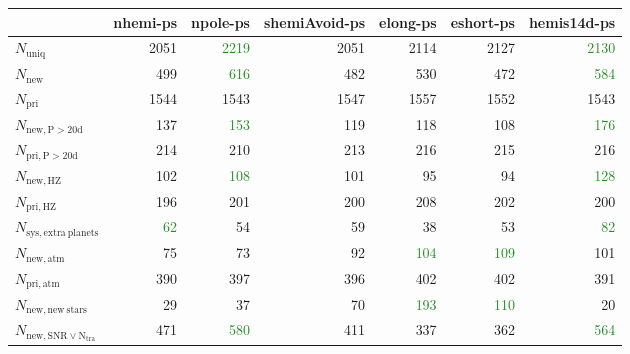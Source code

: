 \begin{tabular}{lrrrrrr}
\toprule
{} &  nhemi-ps &  npole-ps &  shemiAvoid-ps &  elong-ps &  eshort-ps &  hemis14d-ps \\
\midrule
$N_{\mathrm{uniq}}$                &      2051 &      \textcolor{ForestGreen}{2219} &           2051 &      2114 &       2127 &         \textcolor{ForestGreen}{2130} \\
$N_{\mathrm{new}}$                 &       499 &       \textcolor{ForestGreen}{616} &            482 &       530 &        472 &          \textcolor{ForestGreen}{584} \\
$N_{\mathrm{pri}}$                 &      1544 &      1543 &           1547 &      1557 &       1552 &         1543 \\
$N_{\mathrm{new,P>20d}}$           &       137 &       \textcolor{ForestGreen}{153} &            119 &       118 &        108 &          \textcolor{ForestGreen}{176} \\
$N_{\mathrm{pri,P>20d}}$           &       214 &       210 &            213 &       216 &        215 &          216 \\
$N_{\mathrm{new,HZ}}$              &       102 &       \textcolor{ForestGreen}{108} &            101 &        95 &         94 &          \textcolor{ForestGreen}{128} \\
$N_{\mathrm{pri,HZ}}$              &       196 &       201 &            200 &       208 &        202 &          200 \\
$N_{\mathrm{sys,extra\ planets}}$  &        \textcolor{ForestGreen}{62} &        54 &             59 &        38 &         53 &           \textcolor{ForestGreen}{82} \\
$N_{\mathrm{new,atm}}$             &        75 &        73 &             92 &       \textcolor{ForestGreen}{104} &        \textcolor{ForestGreen}{109} &          101 \\
$N_{\mathrm{pri,atm}}$             &       390 &       397 &            396 &       402 &        402 &          391 \\
$N_{\mathrm{new,new\ stars}}$      &        29 &        37 &             70 &       \textcolor{ForestGreen}{193} &        \textcolor{ForestGreen}{110} &           20 \\
$N_{\mathrm{new,SNR\lor N_{tra}}}$ &       471 &       \textcolor{ForestGreen}{580} &            411 &       337 &        362 &          \textcolor{ForestGreen}{564} \\
\bottomrule
\end{tabular}
